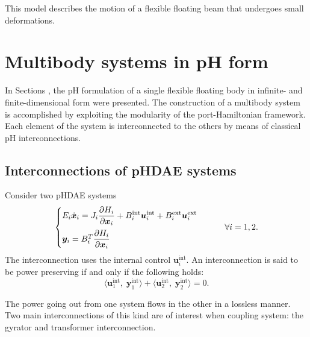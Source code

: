 This model describes the motion of a flexible floating beam that undergoes small deformations. 

\section{Multibody systems in pH form}
In Sections ,  the pH formulation of a single flexible floating body in infinite- and finite-dimensional form were presented. The construction of a multibody system is accomplished by exploiting the modularity of the port-Hamiltonian framework. Each element of the system is interconnected to the others by means of classical pH interconnections.

\subsection{Interconnections of pHDAE systems}
Consider two pHDAE systems
\begin{equation}
\begin{cases}
E_i \dot{\bm{x}}_i = {J}_i \displaystyle\diffp{H_i}{\bm{x}_i} + {B}_i^{\text{int}} \bm{u}_i^{\text{int}} + {B}_i^{\text{ext}} \bm{u}_i^{\text{ext}}  \vspace{2mm} \\
\bm{y}_i = {B}_i^T  \displaystyle\diffp{H_i}{\bm{x}_i}
\end{cases} \qquad \forall i = 1, 2.
\end{equation}
The interconnection uses the internal control $\bm{u}_i^{\text{int}}$. An interconnection is said to be power preserving if and only if the following holds:
\begin{equation} \label{eq:int_balance}
\langle \bm{u}_1^{\text{int}}, \; \bm{y}_1^{\text{int}} \rangle + \langle \bm{u}_2^{\text{int}}, \; \bm{y}_2^{\text{int}} \rangle = 0.
\end{equation}

The power going out from one system flows in the other in a lossless manner. Two main interconnections of this kind are of interest when coupling system: the gyrator and transformer interconnection.

